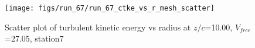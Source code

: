 \begin{figure}[H]
\centering
\texttt{[image: figs/run\_67/run\_67\_ctke\_vs\_r\_mesh\_scatter]}
\caption{Scatter plot of turbulent kinetic energy vs radius at $z/c$=10.00, $V_{free}$=27.05, station7}
\label{fig:run_67_ctke_vs_r_mesh_scatter}
\end{figure}


